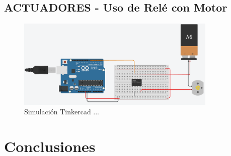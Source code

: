 \documentclass{article}
\begin{document}
\subsection{ACTUADORES - Uso de Relé con Motor}

\begin{figure}[H]
    \centering
    \includegraphics[width=0.85\textwidth]{./img/ckpt_rele_motor.png}
    \caption{Simulación Tinkercad ...}
    \label{fig:motor_driver}
\end{figure}



\section{Conclusiones}
\end{document}
